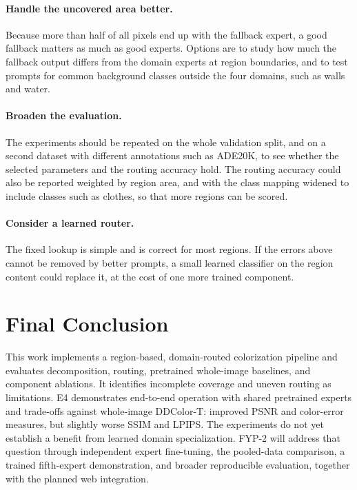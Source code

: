 \documentclass{FastFyp}
\begin{document}
\paragraph{Handle the uncovered area better.} Because more than half of all pixels end up with the fallback expert, a good fallback matters as much as good experts. Options are to study how much the fallback output differs from the domain experts at region boundaries, and to test prompts for common background classes outside the four domains, such as walls and water.

\paragraph{Broaden the evaluation.} The experiments should be repeated on the whole validation split, and on a second dataset with different annotations such as ADE20K, to see whether the selected parameters and the routing accuracy hold. The routing accuracy could also be reported weighted by region area, and with the class mapping widened to include classes such as clothes, so that more regions can be scored.

\paragraph{Consider a learned router.} The fixed lookup is simple and is correct for most regions. If the errors above cannot be removed by better prompts, a small learned classifier on the region content could replace it, at the cost of one more trained component.


\section{Final Conclusion}
\label{sec:final-conclusion}
This work implements a region-based, domain-routed colorization pipeline and evaluates decomposition, routing, pretrained whole-image baselines, and component ablations. It identifies incomplete coverage and uneven routing as limitations. E4 demonstrates end-to-end operation with shared pretrained experts and trade-offs against whole-image DDColor-T: improved PSNR and color-error measures, but slightly worse SSIM and LPIPS. The experiments do not yet establish a benefit from learned domain specialization. FYP-2 will address that question through independent expert fine-tuning, the pooled-data comparison, a trained fifth-expert demonstration, and broader reproducible evaluation, together with the planned web integration.
\end{document}
